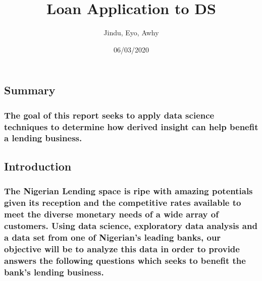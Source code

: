 \documentclass[
]{article}
\title{Loan Application to DS}
\author{Jindu, Eyo, Awhy}
\date{06/03/2020}
\begin{document}
\maketitle

\hypertarget{summary}{%
\subsection{Summary}\label{summary}}

\hypertarget{the-goal-of-this-report-seeks-to-apply-data-science-techniques-to-determine-how-derived-insight-can-help-benefit-a-lending-business.}{%
\subsubsection{The goal of this report seeks to apply data science
techniques to determine how derived insight can help benefit a lending
business.}\label{the-goal-of-this-report-seeks-to-apply-data-science-techniques-to-determine-how-derived-insight-can-help-benefit-a-lending-business.}}

\hypertarget{introduction}{%
\subsection{Introduction}\label{introduction}}

\hypertarget{the-nigerian-lending-space-is-ripe-with-amazing-potentials-given-its-reception-and-the-competitive-rates-available-to-meet-the-diverse-monetary-needs-of-a-wide-array-of-customers.-using-data-science-exploratory-data-analysis-and-a-data-set-from-one-of-nigerians-leading-banks-our-objective-will-be-to-analyze-this-data-in-order-to-provide-answers-the-following-questions-which-seeks-to-benefit-the-banks-lending-business.}{%
\subsubsection{The Nigerian Lending space is ripe with amazing
potentials given its reception and the competitive rates available to
meet the diverse monetary needs of a wide array of customers. Using data
science, exploratory data analysis and a data set from one of Nigerian's
leading banks, our objective will be to analyze this data in order to
provide answers the following questions which seeks to benefit the
bank's lending
business.}\label{the-nigerian-lending-space-is-ripe-with-amazing-potentials-given-its-reception-and-the-competitive-rates-available-to-meet-the-diverse-monetary-needs-of-a-wide-array-of-customers.-using-data-science-exploratory-data-analysis-and-a-data-set-from-one-of-nigerians-leading-banks-our-objective-will-be-to-analyze-this-data-in-order-to-provide-answers-the-following-questions-which-seeks-to-benefit-the-banks-lending-business.}}
\end{document}
